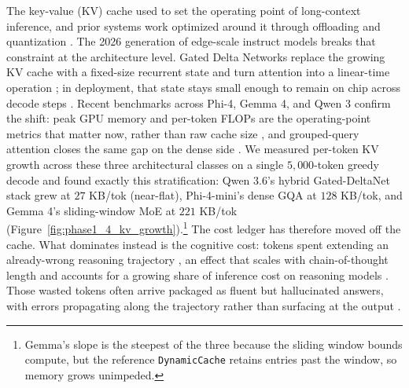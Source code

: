 \documentclass[11pt]{article}
\begin{document}
The key-value (KV) cache used to set the operating point of long-context inference, and prior systems work optimized around it through offloading and quantization \cite{bocharnikov_kv_2026}. The 2026 generation of edge-scale instruct models breaks that constraint at the architecture level. Gated Delta Networks replace the growing KV cache with a fixed-size recurrent state and turn attention into a linear-time operation \cite{yang_gated_2025,sun_fg2-gdn_2026}; in deployment, that state stays small enough to remain on chip across decode steps \cite{gupta_persistent-state_2026}. Recent benchmarks across Phi-4, Gemma 4, and Qwen 3 confirm the shift: peak GPU memory and per-token FLOPs are the operating-point metrics that matter now, rather than raw cache size \cite{manik_gemma_2026}, and grouped-query attention closes the same gap on the dense side \cite{ainslie_gqa_2023}. We measured per-token KV growth across these three architectural classes on a single $5{,}000$-token greedy decode and found exactly this stratification: Qwen 3.6's hybrid Gated-DeltaNet stack grew at $27$ KB/tok (near-flat), Phi-4-mini's dense GQA at $128$ KB/tok, and Gemma 4's sliding-window MoE at $221$ KB/tok (Figure~\ref{fig:phase1_4_kv_growth}).\footnote{Gemma's slope is the steepest of the three because the sliding window bounds compute, but the reference \texttt{DynamicCache} retains entries past the window, so memory grows unimpeded.} The cost ledger has therefore moved off the cache. What dominates instead is the cognitive cost: tokens spent extending an already-wrong reasoning trajectory \cite{chen_think_2026,wu_when_2025,fu_multiple_2026}, an effect that scales with chain-of-thought length and accounts for a growing share of inference cost on reasoning models \cite{zhang_100_2025}. Those wasted tokens often arrive packaged as fluent but hallucinated answers, with errors propagating along the trajectory rather than surfacing at the output \cite{zhang_harnessing_2026}.

\end{document}
